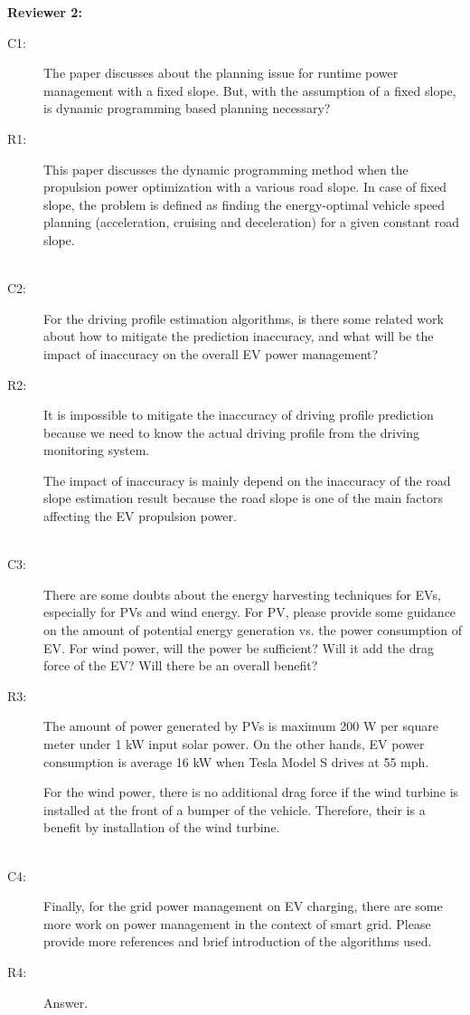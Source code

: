 \documentclass[onecolumn]{IEEEconf}
\begin{document}
\pagebreak


\textbf{Reviewer 2:}
\begin{description}
\item [C1: ] The paper discusses about the planning issue for runtime power management with a fixed slope. But, with the assumption of a fixed slope, is dynamic programming based planning necessary?
\item [R1: ] This paper discusses the dynamic programming method when the propulsion power optimization with a various road slope. In case of fixed slope, the problem is defined as finding the energy-optimal vehicle speed planning (acceleration, cruising and deceleration) for a given constant road slope.\\
~\\

\item [C2: ] For the driving profile estimation algorithms, is there some related work about how to mitigate the prediction inaccuracy, and what will be the impact of inaccuracy on the overall EV power management?
\item [R2: ] It is impossible to mitigate the inaccuracy of driving profile prediction because we need to know the actual driving profile from the driving monitoring system. 

The impact of inaccuracy is mainly depend on the inaccuracy of the road slope estimation result because the road slope is one of the main factors affecting the EV propulsion power.\\
~\\

\item [C3: ] There are some doubts about the energy harvesting techniques for EVs, especially for PVs and wind energy. For PV, please provide some guidance on the amount of potential energy generation vs. the power consumption of EV. For wind power, will the power be sufficient? Will it add the drag force of the EV? Will there be an overall benefit?
\item [R3: ] The amount of power generated by PVs is maximum 200 W per square meter under 1 kW input solar power. On the other hands, EV power consumption is average 16 kW when Tesla Model S drives at 55 mph.

For the wind power, there is no additional drag force if the wind turbine is installed at the front of a bumper of the vehicle. Therefore, their is a benefit by installation of the wind turbine.\\
~\\

\item [C4: ] Finally, for the grid power management on EV charging, there are some more work on power management in the context of smart grid. Please provide more references and brief introduction of the algorithms used.
\item [R4: ] Answer.\\
~\\

\end{description}
\end{document}

